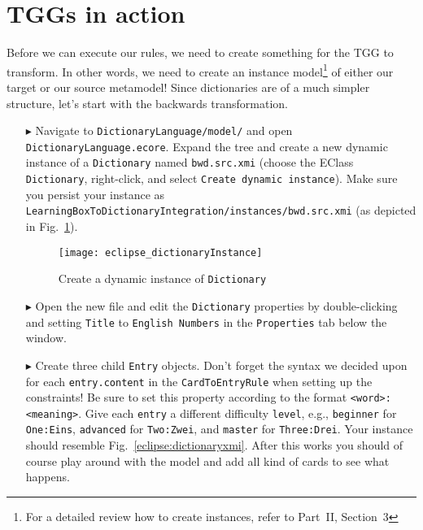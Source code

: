 \newpage
\section{TGGs in action}
\genHeader
\label{sect:TGGs_in_Action}

Before we can execute our rules, we need to create something for the TGG to transform. In other words, we need to create an instance model\footnote{For a
detailed review how to create instances, refer to Part~II, Section~3} of either our target or our source metamodel! Since dictionaries are
of a much simpler structure, let's start with the backwards transformation.

\begin{itemize}

\item[$\blacktriangleright$] Navigate to \texttt{Dictionary\-Language/model/} and open \texttt{Dictio\-nary\-Lang\-uage.ecore}. Expand the tree and create a new dynamic instance of a \texttt{Dictionary} named \texttt{bwd.src.xmi} (choose the EClass \texttt{Dictionary}, right-click, and select \texttt{Create dynamic instance}). 
Make sure you persist your instance as \texttt{Learn\-ing\-Box\-To\-Dictionary\-In\-te\-gra\-tion/in\-stan\-ces/bwd.src.xmi} (as depicted in Fig.~\ref{eclipse:create_instance_dict}).

\begin{figure}[htbp]
\begin{center}
  \texttt{[image: eclipse\_dictionaryInstance]}
  \caption{Create a dynamic instance of \texttt{Dictionary}}
  \label{eclipse:create_instance_dict}
\end{center}
\end{figure}

\newpage

\item[$\blacktriangleright$] Open the new file and edit the \texttt{Dictionary} properties by double-clicking and setting \texttt{Title} to \texttt{English Numbers} in the \texttt{Properties} tab below the window.

\vspace{0.5cm}

\item[$\blacktriangleright$] Create three child \texttt{Entry} objects.
Don't forget the syntax we decided upon for each \texttt{entry.content} in the \texttt{CardToEntryRule} when setting up the constraints! 
Be sure to set this property according to the format \texttt{<word>:<meaning>}. 
Give each \texttt{entry} a different difficulty \texttt{level}, e.g., \texttt{beginner} for \texttt{One:Eins}, \texttt{advanced} for \texttt{Two:Zwei}, and \texttt{master} for \texttt{Three:Drei}.
Your instance should resemble Fig.~\ref{eclipse:dictionaryxmi}.
After this works you should of course play around with the model and add all kind of cards to see what happens.


\end{itemize}
